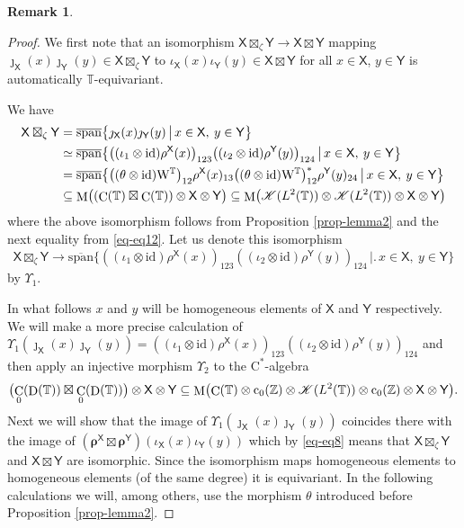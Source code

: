 \documentclass[12pt,reqno,a4paper]{amsart}
\theoremstyle{definition}
\newtheorem{remark}[proposition]{Remark}
\newcommand{\cst}{\ensuremath{\mathrm{C}^*}}
\newcommand{\id}{\mathrm{id}}
\newcommand{\tens}{\otimes}
\newcommand{\TT}{\mathbb{T}}
\newcommand{\ZZ}{\mathbb{Z}}
\newcommand{\cK}{\mathscr{K}}
\newcommand{\sX}{\mathsf{X}}
\newcommand{\sY}{\mathsf{Y}}
\newcommand{\brho}{{\boldsymbol{\rho}}}
\newcommand{\ww}{\mathrm{W}}
\DeclareMathOperator{\C}{C}
\DeclareMathOperator{\D}{D}
\DeclareMathOperator{\Ltwo}{\mathnormal{L}^2}
\DeclareMathOperator{\M}{M}
\numberwithin{equation}{section}
\begin{document}
\begin{appendices}
\begin{remark}
\end{remark}

\begin{proof}
We first note that an isomorphism $\sX\boxtimes_\zeta\sY\to\sX\boxtimes\sY$ mapping $\jmath_\sX(x)\jmath_\sY(y)\in\sX\boxtimes_\zeta\sY$ to $\iota_\sX(x)\iota_\sY(y)\in\sX\boxtimes\sY$ for all $x\in\sX$, $y\in\sY$ is automatically $\TT$-equivariant.

We have
\begin{align*}
\sX\boxtimes_\zeta\sY
&=\operatorname{\overline{span}}
\bigl\{\jmath_{\sX}(x)\jmath_{\sY}(y)\,\bigr|\bigl.\,x\in\sX,\:y\in\sY\bigr\}\\
&\simeq\operatorname{\overline{span}}
\bigl\{
\bigl((\iota_1\tens\id)\rho^\sX(x)\bigr)_{123}
\bigl((\iota_2\tens\id)\rho^\sY(y)\bigr)_{124}
\,\bigr|\bigl.\,
x\in\sX,\:y\in\sY\bigr\}\\
&=\operatorname{\overline{span}}
\bigl\{
\bigl((\theta\tens\id)\ww^{\TT}\bigr)_{12}
\rho^\sX(x)_{13}
\bigl((\theta\tens\id)\ww^{\TT}\bigr)^*_{12}
\rho^\sY(y)_{24}
\,\bigr|\bigl.\,
x\in\sX,\:y\in\sY\bigr\}\\
&\subseteq\M\bigl((\C(\TT)\boxtimes\C(\TT))\tens\sX\tens\sY\bigr)
\subseteq
\M\bigl(\cK(\Ltwo(\TT))\tens\cK(\Ltwo(\TT))\tens\sX\tens\sY\bigr)
\end{align*}
where the above isomorphism follows from Proposition \ref{prop-lemma2} and the next equality from \eqref{eq-eq12}. Let us denote this isomorphism
\[
\sX\boxtimes_\zeta\sY\longrightarrow\operatorname{\overline{span}}
\bigl\{
((\iota_1\tens\id)\rho^\sX(x))_{123}
((\iota_2\tens\id)\rho^\sY(y))_{124}
\,\bigr|\bigl.\,
x\in\sX,\:y\in\sY\bigr\}
\]
by $\Upsilon_1$.

In what follows $x$ and $y$ will be homogeneous elements of $\sX$ and $\sY$ respectively. We will make a more precise calculation of $\Upsilon_1(\jmath_{\sX}(x)\jmath_{\sY}(y))=((\iota_1\tens\id)\rho^\sX(x))_{123}
((\iota_2\tens\id)\rho^\sY(y))_{124}$ and then apply an injective morphism $\Upsilon_2$ to the \cst-algebra
\[
\bigl(\C_0(\D(\TT))\boxtimes\C_0(\D(\TT))\bigr)\tens\sX\tens\sY
\subseteq
\M\bigl(
\C(\TT)\tens\mathrm{c}_0(\ZZ)\tens\cK(\Ltwo(\TT))\tens\mathrm{c}_0(\ZZ)\tens\sX\tens\sY\bigr).
\]
Next we will show that the image of $\Upsilon_1(\jmath_{\sX}(x)\jmath_{\sY}(y))$ coincides there with the image of $(\brho^\sX\boxtimes\brho^\sY)(\iota_\sX(x)\iota_\sY(y))$ which by \eqref{eq-eq8} means that $\sX\boxtimes_\zeta\sY$ and $\sX\boxtimes\sY$ are isomorphic. Since the isomorphism maps homogeneous elements to homogeneous elements (of the same degree) it is equivariant. In the following calculations we will, among others, use the morphism $\theta$ introduced before Proposition \ref{prop-lemma2}.


\end{proof}
\end{appendices}
\end{document}
